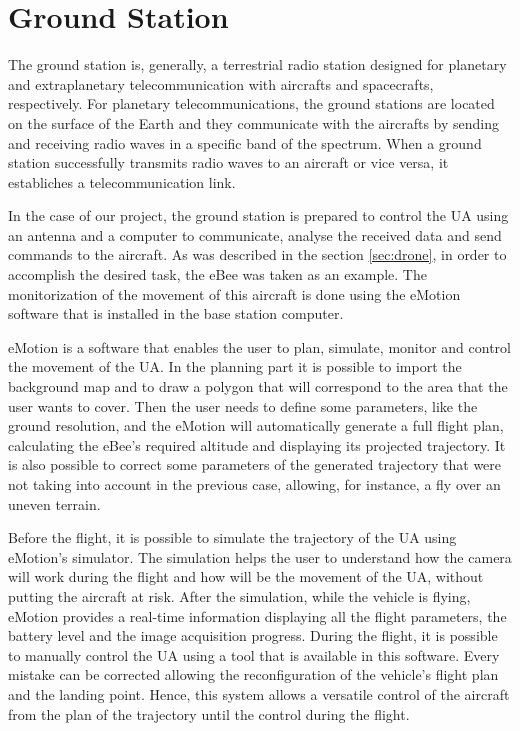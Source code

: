 \section{Ground Station}\label{sec:gs}

The ground station is, generally, a terrestrial radio station designed for planetary and extraplanetary telecommunication with aircrafts and spacecrafts, respectively. For planetary telecommunications, the ground stations are located on the surface of the Earth and they communicate with the aircrafts by sending and receiving radio waves in a specific band of the spectrum. When a ground station successfully transmits radio waves to an aircraft or vice versa, it establiches a telecommunication link.

In the case of our project, the ground station is prepared to control the UA using an antenna and a computer to communicate, analyse the received data and send commands to the aircraft. As was described in the section \ref{sec:drone}, in order to accomplish the desired task, the eBee was taken as an example. The monitorization of the movement of this aircraft is done using the eMotion software that is installed in the base station computer.

eMotion is a software that enables the user to plan, simulate, monitor and control the movement of the UA. In the planning part it is possible to import the background map and to draw a polygon that will correspond to the area that the user wants to cover. Then the user needs to define some parameters, like the ground resolution, and the eMotion will automatically generate a full flight plan, calculating the eBee’s required altitude and displaying its projected trajectory. It is also possible to correct some parameters of the generated trajectory that were not taking into account in the previous case, allowing, for instance, a fly over an uneven terrain.

Before the flight, it is possible to simulate the trajectory of the UA using eMotion's simulator. The simulation helps the user to understand how the camera will work during the flight and how will be the movement of the UA, without putting the aircraft at risk. After the simulation, while the vehicle is flying, eMotion provides a real-time information displaying all the flight parameters, the battery level and the image acquisition progress. During the flight, it is possible to manually control the UA using a tool that is available in this software. Every mistake can be corrected allowing the reconfiguration of the vehicle's flight plan and the landing point. Hence, this system allows a versatile control of the aircraft from the plan of the trajectory until the control during the flight.